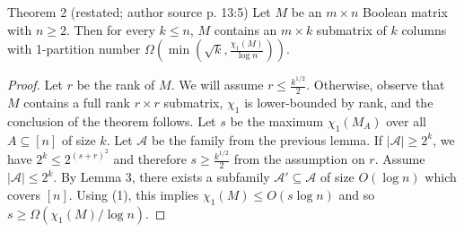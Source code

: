 \begin{originalresult}{Theorem 2 (restated; author source p. 13:5)}
Let $M$ be an $m\times n$ Boolean matrix with $n\ge2$. Then for every $k\le n$, $M$ contains an $m\times k$ submatrix of $k$ columns with 1-partition number $\Omega(\min(\sqrt{k},\frac{\chi_1(M)}{\log n}))$.
\end{originalresult}
\begin{proof}
Let $r$ be the rank of $M$. We will assume $r\le\frac{k^{1/2}}2$. Otherwise, observe that $M$ contains a full rank $r\times r$ submatrix, $\chi_1$ is lower-bounded by rank, and the conclusion of the theorem follows.
Let $s$ be the maximum $\chi_1(M_A)$ over all $A\subseteq[n]$ of size $k$. Let $\mathcal A$ be the family from the previous lemma. If $|\mathcal A|\ge2^k$, we have $2^k\le2^{(s+r)^2}$ and therefore $s\ge\frac{k^{1/2}}2$ from the assumption on $r$.
Assume $|\mathcal A|\le2^k$. By Lemma 3, there exists a subfamily $\mathcal A'\subseteq\mathcal A$ of size $O(\log n)$ which covers $[n]$. Using (1), this implies $\chi_1(M)\le O(s\log n)$ and so $s\ge\Omega(\chi_1(M)/\log n)$.
\end{proof}
